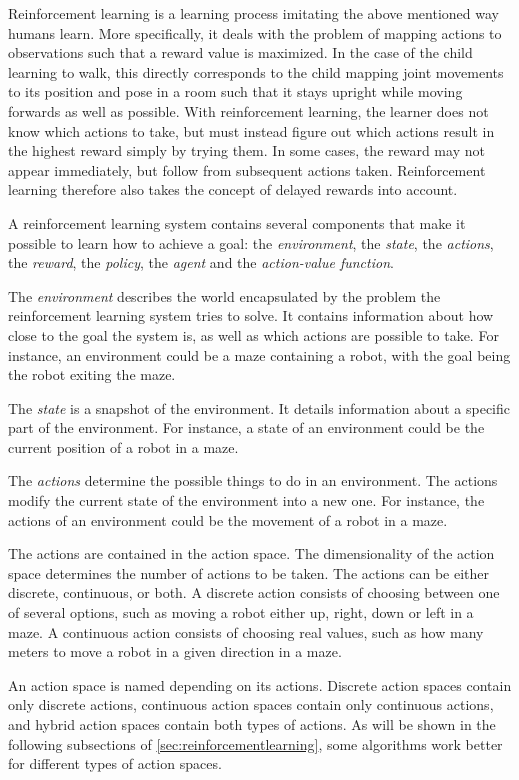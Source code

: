 \documentclass{kththesis}
\begin{document}
Reinforcement learning is a learning process imitating the above mentioned way humans learn. More specifically, it deals with the problem of mapping actions to observations such that a reward value is maximized. In the case of the child learning to walk, this directly corresponds to the child mapping joint movements to its position and pose in a room such that it stays upright while moving forwards as well as possible. With reinforcement learning, the learner does not know which actions to take, but must instead figure out which actions result in the highest reward simply by trying them. In some cases, the reward may not appear immediately, but follow from subsequent actions taken. Reinforcement learning therefore also takes the concept of delayed rewards into account. \parencite{sutton1998introduction}

A reinforcement learning system contains several components that make it possible to learn how to achieve a goal: the \textit{environment}, the \textit{state}, the \textit{actions}, the \textit{reward}, the \textit{policy}, the \textit{agent} and the \textit{action-value function}.

The \textit{environment} describes the world encapsulated by the problem the reinforcement learning system tries to solve. It contains information about how close to the goal the system is, as well as which actions are possible to take. For instance, an environment could be a maze containing a robot, with the goal being the robot exiting the maze.

The \textit{state} is a snapshot of the environment. It details information about a specific part of the environment. For instance, a state of an environment could be the current position of a robot in a maze.

The \textit{actions} determine the possible things to do in an environment. The actions modify the current state of the environment into a new one. For instance, the actions of an environment could be the movement of a robot in a maze. 

The actions are contained in the action space. The dimensionality of the action space determines the number of actions to be taken. The actions can be either discrete, continuous, or both. A discrete action consists of choosing between one of several options, such as moving a robot either up, right, down or left in a maze. A continuous action consists of choosing real values, such as how many meters to move a robot in a given direction in a maze.

An action space is named depending on its actions. Discrete action spaces contain only discrete actions, continuous action spaces contain only continuous actions, and hybrid action spaces contain both types of actions. As will be shown in the following subsections of \autoref{sec:reinforcementlearning}, some algorithms work better for different types of action spaces.
\end{document}
